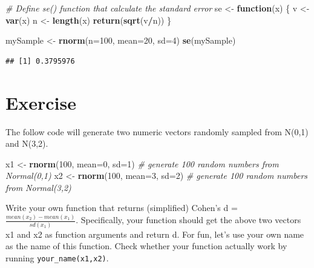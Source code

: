 \documentclass[]{book}
\newenvironment{Shaded}{\begin{snugshade}}{\end{snugshade}}
\newcommand{\CommentTok}[1]{\textcolor[rgb]{0.56,0.35,0.01}{\textit{#1}}}
\newcommand{\ControlFlowTok}[1]{\textcolor[rgb]{0.13,0.29,0.53}{\textbf{#1}}}
\newcommand{\DataTypeTok}[1]{\textcolor[rgb]{0.13,0.29,0.53}{#1}}
\newcommand{\DecValTok}[1]{\textcolor[rgb]{0.00,0.00,0.81}{#1}}
\newcommand{\KeywordTok}[1]{\textcolor[rgb]{0.13,0.29,0.53}{\textbf{#1}}}
\newcommand{\NormalTok}[1]{#1}
\newcommand{\OperatorTok}[1]{\textcolor[rgb]{0.81,0.36,0.00}{\textbf{#1}}}
\newcommand{\StringTok}[1]{\textcolor[rgb]{0.31,0.60,0.02}{#1}}
\begin{document}
\begin{Shaded}
\begin{Highlighting}[]
\CommentTok{# Define se() function that calculate the standard error}
\NormalTok{se <-}\StringTok{ }\ControlFlowTok{function}\NormalTok{(x) \{}
\NormalTok{  v <-}\StringTok{ }\KeywordTok{var}\NormalTok{(x)}
\NormalTok{  n <-}\StringTok{ }\KeywordTok{length}\NormalTok{(x)}
  \KeywordTok{return}\NormalTok{(}\KeywordTok{sqrt}\NormalTok{(v}\OperatorTok{/}\NormalTok{n))}
\NormalTok{\}}
\end{Highlighting}
\end{Shaded}

\begin{Shaded}
\begin{Highlighting}[]
\NormalTok{mySample <-}\StringTok{ }\KeywordTok{rnorm}\NormalTok{(}\DataTypeTok{n=}\DecValTok{100}\NormalTok{, }\DataTypeTok{mean=}\DecValTok{20}\NormalTok{, }\DataTypeTok{sd=}\DecValTok{4}\NormalTok{)}
\KeywordTok{se}\NormalTok{(mySample)}
\end{Highlighting}
\end{Shaded}

\begin{verbatim}
## [1] 0.3795976
\end{verbatim}

\hypertarget{exercise-5}{%
\section{Exercise}\label{exercise-5}}

The follow code will generate two numeric vectors randomly sampled from N(0,1) and N(3,2).

\begin{Shaded}
\begin{Highlighting}[]
\NormalTok{x1 <-}\StringTok{ }\KeywordTok{rnorm}\NormalTok{(}\DecValTok{100}\NormalTok{, }\DataTypeTok{mean=}\DecValTok{0}\NormalTok{, }\DataTypeTok{sd=}\DecValTok{1}\NormalTok{)  }\CommentTok{# generate 100 random numbers from Normal(0,1)}
\NormalTok{x2 <-}\StringTok{ }\KeywordTok{rnorm}\NormalTok{(}\DecValTok{100}\NormalTok{, }\DataTypeTok{mean=}\DecValTok{3}\NormalTok{, }\DataTypeTok{sd=}\DecValTok{2}\NormalTok{)  }\CommentTok{# generate 100 random numbers from Normal(3,2)}
\end{Highlighting}
\end{Shaded}

Write your own function that returns (simplified) Cohen's d = \(\frac{mean(x_2)-mean(x_1)}{sd(x_1)}\). Specifically, your function should get the above two vectors x1 and x2 as function arguments and return d. For fun, let's use your own name as the name of this function. Check whether your function actually work by running \texttt{your\_name(x1,x2)}.
\end{document}
